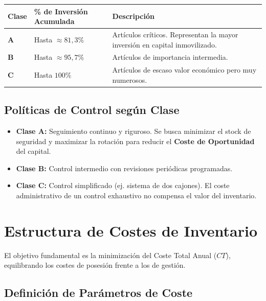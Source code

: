 \documentclass[11pt,a4paper]{article}
\begin{document}
\begin{center}
    \renewcommand{\arraystretch}{1.25}
    \begin{tabularx}{\textwidth}{@{}l p{3.4cm} X@{}}
        \toprule
        Clase      & \% de Inversión Acumulada & Descripción                                                                 \\
        \midrule
        \textbf{A} & Hasta $\approx 81{,}3\%$  & Artículos críticos. Representan la mayor inversión en capital inmovilizado. \\
        \textbf{B} & Hasta $\approx 95{,}7\%$  & Artículos de importancia intermedia.                                        \\
        \textbf{C} & Hasta $100\%$             & Artículos de escaso valor económico pero muy numerosos.                     \\
        \bottomrule
    \end{tabularx}
\end{center}

\subsection{Políticas de Control según Clase}

\begin{itemize}
    \item \textbf{Clase A:} Seguimiento continuo y riguroso. Se busca minimizar el stock de seguridad y maximizar la rotación para reducir el \textbf{Coste de Oportunidad} del capital.
    \item \textbf{Clase B:} Control intermedio con revisiones periódicas programadas.
    \item \textbf{Clase C:} Control simplificado (ej. sistema de dos cajones). El coste administrativo de un control exhaustivo no compensa el valor del inventario.

\end{itemize}
\section{Estructura de Costes de Inventario}

El objetivo fundamental es la minimización del Coste Total Anual ($CT$), equilibrando los costes de posesión frente a los de gestión.

\subsection{Definición de Parámetros de Coste}
\end{document}
